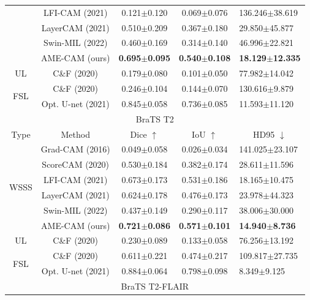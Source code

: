 \begin{table}
\begin{tabular}{c|c|c|c|l}
               & LFI-CAM (2021)    & 0.121$\pm$0.120 & 0.069$\pm$0.076 & 136.246$\pm$38.619 \\
               & LayerCAM (2021)   & 0.510$\pm$0.209 & 0.367$\pm$0.180 & 29.850$\pm$45.877  \\
               & Swin-MIL (2022)   & 0.460$\pm$0.169 & 0.314$\pm$0.140 & 46.996$\pm$22.821  \\
               & AME-CAM  (ours)   & \textbf{0.695$\pm$0.095} & \textbf{0.540$\pm$0.108} & \textbf{18.129$\pm$12.335}  \\ \hline
UL             & C\&F (2020)       & 0.179$\pm$0.080 & 0.101$\pm$0.050 & 77.982$\pm$14.042  \\ \hline
\multirow{2}{*}{FSL}            & C\&F (2020)       & 0.246$\pm$0.104 & 0.144$\pm$0.070 & 130.616$\pm$9.879  \\
               & Opt. U-net (2021) & 0.845$\pm$0.058 & 0.736$\pm$0.085 & 11.593$\pm$11.120  \\ \hline
\multicolumn{5}{c}{BraTS T2} \\ \hline
Type           & Method            & Dice $\uparrow$         & IoU $\uparrow$          & \multicolumn{1}{c}{HD95 $\downarrow$}            \\ \hline
\multirow{6}{*}{WSSS}           & Grad-CAM (2016)   & 0.049$\pm$0.058 & 0.026$\pm$0.034 & 141.025$\pm$23.107 \\
               & ScoreCAM (2020)   & 0.530$\pm$0.184 & 0.382$\pm$0.174 & 28.611$\pm$11.596  \\
               & LFI-CAM (2021)    & 0.673$\pm$0.173 & 0.531$\pm$0.186 & 18.165$\pm$10.475  \\
               & LayerCAM (2021)   & 0.624$\pm$0.178 & 0.476$\pm$0.173 & 23.978$\pm$44.323  \\
               & Swin-MIL (2022)   & 0.437$\pm$0.149 & 0.290$\pm$0.117 & 38.006$\pm$30.000  \\
               & AME-CAM  (ours)   & \textbf{0.721$\pm$0.086} & \textbf{0.571$\pm$0.101} & \textbf{14.940$\pm$8.736}   \\ \hline
UL             & C\&F (2020)       & 0.230$\pm$0.089 & 0.133$\pm$0.058 & 76.256$\pm$13.192  \\ \hline
\multirow{2}{*}{FSL}            & C\&F (2020)       & 0.611$\pm$0.221 & 0.474$\pm$0.217 & 109.817$\pm$27.735 \\
               & Opt. U-net (2021) & 0.884$\pm$0.064 & 0.798$\pm$0.098 & 8.349$\pm$9.125    \\ \hline
\multicolumn{5}{c}{BraTS T2-FLAIR} \\ \hline

\end{tabular}
\end{table}
